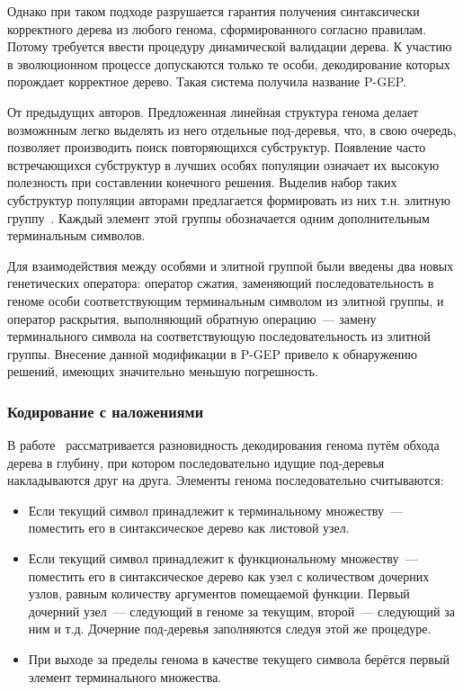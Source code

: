 Однако при таком подходе разрушается гарантия получения синтаксически корректного дерева из любого генома, сформированного согласно правилам. Потому требуется ввести процедуру динамической валидации дерева. К участию в эволюционном процессе допускаются только те особи, декодирование которых порождает корректное дерево. Такая система получила название P-GEP.

От предыдущих авторов. Предложенная линейная структура генома делает возможнным легко выделять из него отдельные под-деревья, что, в свою очередь, позволяет производить поиск повторяющихся субструктур. Появление часто встречающихся субструктур в лучших особях популяции означает их высокую полезность при составлении конечного решения. Выделив набор таких субструктур популяции авторами предлагается формировать из них т.н. элитную группу~\cite{Substructures(ICMLA05)_XLi}. Каждый элемент этой группы обозначается одним дополнительным терминальным символов.

Для взаимодействия между особями и элитной группой были введены два новых генетических оператора: оператор сжатия, заменяющий последовательность в геноме особи соответствующим терминальным символом из элитной группы, и оператор раскрытия, выполняющий обратную операцию~--- замену терминального символа на соответствующую последовательность из элитной группы.
Внесение данной модификации в P-GEP привело к обнаружению решений, имеющих значительно меньшую погрешность.


\subsubsection{Кодирование с наложениями}

В работе~\cite{conf/icnc/PengTZY05} рассматривается разновидность декодирования генома путём обхода дерева в глубину, при котором последовательно идущие под-деревья накладываются друг на друга. Элементы генома последовательно считываются:
\begin{itemize} \itemsep0pt \parskip0pt 
  \item Если текущий символ принадлежит к терминальному множеству~--- поместить его в синтаксическое дерево как листовой узел.
  \item Если текущий символ принадлежит к функциональному множеству~--- поместить его в синтаксическое дерево как узел с количеством дочерних узлов, равным количеству аргументов помещаемой функции. Первый дочерний узел~--- следующий в геноме за текущим, второй~--- следующий за ним и т.д. Дочерние под-деревья заполняются следуя этой же процедуре.
  \item При выходе за пределы генома в качестве текущего символа берётся первый элемент терминального множества.
\end{itemize}

